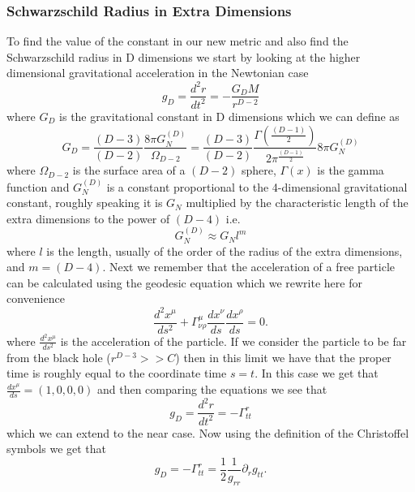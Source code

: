 \documentclass[12pt]{article}
\numberwithin{equation}{section}
\numberwithin{figure}{section}
\begin{document}
\subsubsection{Schwarzschild Radius in Extra Dimensions} %
\label{sub:schwarzschild_radius_in_d_dimensions}
To find the value of the constant in our new metric and also find the Schwarzschild radius in D dimensions we start by looking at the higher dimensional gravitational acceleration in the Newtonian case
\begin{equation}
	g_{D}=\frac{d^{2}r}{dt^{2}}= -\frac{G_{D}M}{r^{D-2}} \label{eq:newt-extra}
\end{equation}
where $G_{D}$ is the gravitational constant in D dimensions which we can define as 
\begin{equation}
	G_{D}=\frac{(D-3)}{(D-2)}\frac{8\pi G_{N}^{(D)}}{\Omega_{D-2}}=\frac{(D-3)}{(D-2)}\frac{\Gamma\left(\frac{(D-1)}{2}\right)}{2\pi^{\frac{(D-1)}{2}}}8\pi G_{N}^{(D)}
\end{equation}
where $\Omega_{D-2}$ is the surface area of a $(D-2)$ sphere, $\Gamma(x)$ is the gamma function and $G_{N}^{(D)}$ is a constant proportional to the 4-dimensional gravitational constant, roughly speaking it is $G_{N}$ multiplied by the characteristic length of the extra dimensions to the power of $(D-4)$\cite{ newton_higher_dimension} i.e.
\begin{equation}
	G_{N}^{(D)}\approx G_{N} l^{m}
\end{equation}
where $l$ is the length, usually of the order of the radius of the extra dimensions, and $m=(D-4)$. Next we remember that the acceleration of a free particle can be calculated using the geodesic equation which we rewrite here for convenience 
\begin{equation}
	\frac{d^2x^\mu}{ds^2} + \Gamma^{\mu}_{\nu\rho}\frac{dx^\nu}{ds}\frac{dx^\rho}{ds} = 0.
\end{equation}
where $\frac{d^2x^\mu}{ds^2}$ is the acceleration of the particle. If we consider the particle to be far from the black hole ($r^{D-3}>>C$) then in this limit we have that the proper time is roughly equal to the coordinate time $s=t$. In this case we get that $\frac{dx^{\mu}}{ds}=(1,0,0,0)$ and then comparing the equations we see that
\begin{equation}
	g_{D}=\frac{d^{2}r}{dt^{2}}=-\Gamma^{r}_{tt}
\end{equation}
which we can extend to the near case. Now using the definition of the Christoffel symbols we get that
\begin{equation}
	g_{D}=-\Gamma^{r}_{tt}=\frac{1}{2}\frac{1}{g_{rr}}\partial_{r}g_{tt}.
\end{equation}
\end{document}
